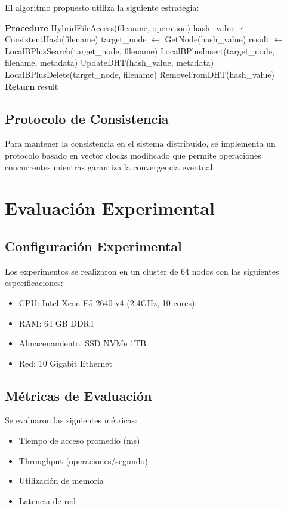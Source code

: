 \documentclass[conference]{IEEEtran}
\begin{document}
El algoritmo propuesto utiliza la siguiente estrategia:

\begin{algorithmic}
\STATE \textbf{Procedure} HybridFileAccess(filename, operation)
\STATE hash\_value $\leftarrow$ ConsistentHash(filename)
\STATE target\_node $\leftarrow$ GetNode(hash\_value)
    \STATE result $\leftarrow$ LocalBPlusSearch(target\_node, filename)
    \STATE LocalBPlusInsert(target\_node, filename, metadata)
    \STATE UpdateDHT(hash\_value, metadata)
    \STATE LocalBPlusDelete(target\_node, filename)
    \STATE RemoveFromDHT(hash\_value)
\ENDIF
\STATE \textbf{Return} result
\end{algorithmic}

\subsection{Protocolo de Consistencia}

Para mantener la consistencia en el sistema distribuido, se implementa un protocolo basado en vector clocks modificado que permite operaciones concurrentes mientras garantiza la convergencia eventual.

\section{Evaluación Experimental}

\subsection{Configuración Experimental}

Los experimentos se realizaron en un cluster de 64 nodos con las siguientes especificaciones:
\begin{itemize}
\item CPU: Intel Xeon E5-2640 v4 (2.4GHz, 10 cores)
\item RAM: 64 GB DDR4
\item Almacenamiento: SSD NVMe 1TB
\item Red: 10 Gigabit Ethernet
\end{itemize}

\subsection{Métricas de Evaluación}

Se evaluaron las siguientes métricas:
\begin{itemize}
\item Tiempo de acceso promedio (ms)
\item Throughput (operaciones/segundo)
\item Utilización de memoria
\item Latencia de red
\end{itemize}
\end{document}
